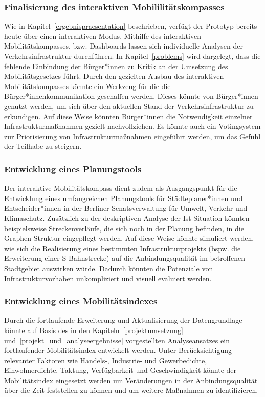 \subsubsection{Finalisierung des interaktiven Mobililitätskompasses}
Wie in Kapitel~\ref{ergebnispraesentation} beschrieben, verfügt der Prototyp bereits heute über einen interaktiven Modus. Mithilfe des interaktiven Mobilitätskompasses, bzw. Dashboards lassen sich individuelle Analysen der Verkehrsinfrastruktur durchführen. In Kapitel~\ref{problems} wird dargelegt, dass die fehlende Einbindung der Bürger*innen zu Kritik an der Umsetzung des Mobilitätsgesetzes führt. Durch den gezielten Ausbau des interaktiven Mobilitätskompasses könnte ein Werkzeug für die die Bürger*innenkommunikation geschaffen werden. Dieses könnte von Bürger*innen genutzt werden, um sich über den aktuellen Stand der Verkehrsinfrastruktur zu erkundigen. Auf diese Weise könnten Bürger*innen die Notwendigkeit einzelner Infrastrukturmaßnahmen gezielt nachvollziehen. Es könnte auch ein Votingsystem zur Priorisierung von Infrastrukturmaßnahmen eingeführt werden, um das Gefühl der Teilhabe zu steigern.


\subsubsection{Entwicklung eines Planungstools}
Der interaktive Mobilitätskompass dient zudem als Ausgangspunkt für die Entwicklung eines umfangreichen Planungstools für Städteplaner*innen und Entscheider*innen in der Berliner Senatsverwaltung für Umwelt, Verkehr und Klimaschutz. Zusätzlich zu der deskriptiven Analyse der Ist-Situation könnten beispielsweise Streckenverläufe, die sich noch in der Planung befinden, in die Graphen-Struktur eingepflegt werden. Auf diese Weise könnte simuliert werden, wie sich die Realisierung eines bestimmten Infrastrukturprojekts (bspw. die Erweiterung einer S-Bahnstrecke) auf die Anbindungsqualität im betroffenen Stadtgebiet auswirken würde. Dadurch könnten die Potenziale von Infrastrukturvorhaben unkompliziert und visuell evaluiert werden.

\subsubsection{Entwicklung eines Mobilitätsindexes}\label{mobwob_index}
Durch die fortlaufende Erweiterung und Aktualisierung der Datengrundlage könnte auf Basis des in den Kapiteln~\ref{projektumsetzung} und~\ref{projekt_und_analyseergebnisse} vorgestellten Analyseansatzes ein fortlaufender Mobilitätsindex entwickelt werden. Unter Berücksichtigung relevanter Faktoren wie Handels-, Industrie- und Gewerbedichte, Einwohnerdichte, Taktung, Verfügbarkeit und Geschwindigkeit könnte der Mobilitätsindex eingesetzt werden um Veränderungen in der Anbindungsqualität über die Zeit feststellen zu können und um weitere Maßnahmen zu identifizieren.

